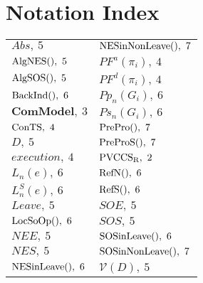 \documentclass{acm_proc_article-sp}
\begin{document}
\section{Notation Index}
\begin{table}[htbp]
\small
\begin{tabular}{ll}
$Abs,~5 $& $\rm{NESinNonLeave()},~7 $\\
$\rm{AlgNES()}, ~5$& $PF^a(\pi_{\textit{i}}), ~4$\\
$\rm{AlgSOS()}, ~5 $& $PF^d(\pi_{\textit{i}}), ~4 $\\
$\rm{BackInd()}, ~6 $& $Pp_{n}(G_{\textit{i}}),~6 $\\
$\textbf{ComModel}, ~3 $& $Ps_{n}(G_{\textit{i}}),~6$\\
$\rm{ConTS}, ~4 $& $\rm{PrePro()},~7$\\
$D ,~5$&$\rm{PreProS()},~7$\\
$execution, ~4$& $\rm{PVCCS}\textsubscript{R},~2 $\\
$L_{n}(e),~6 $&$\rm{RefN()},~6$\\
$L_{n}^{S}(e), ~6$&$\rm{RefS()},~6$\\
$Leave,~5 $& $SOE, ~5$\\
$\rm{LocSoOp()},~6 $& $SOS, ~5 $\\
$NEE,~5 $& $\rm{SOSinLeave()}, ~6$\\
$NES, ~5$& $\rm{SOSinNonLeave()}, ~7$\\
$\rm{NESinLeave()},~6 $& $\mathcal{V}(D),~5$\\
\end{tabular}
\end{table}
\end{document}
